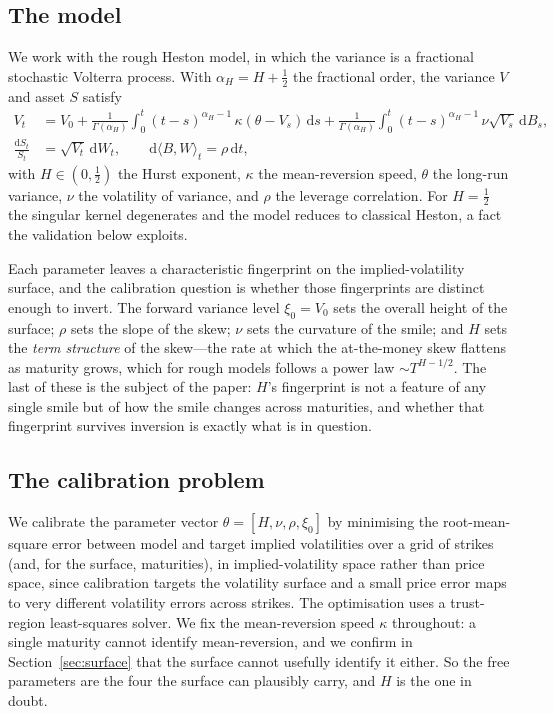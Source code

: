 \documentclass[11pt,a4paper]{article}
\numberwithin{equation}{section}
\begin{document}
\subsection{The model}

We work with the rough Heston model, in which the variance is a fractional stochastic
Volterra process. With $\alpha_{\!H}=H+\tfrac12$ the fractional order, the variance $V$ and
asset $S$ satisfy
\begin{align}
V_t &= V_0 + \frac{1}{\Gamma(\alpha_{\!H})}\int_0^t (t-s)^{\alpha_{\!H}-1}\,
       \kappa(\theta - V_s)\,\mathrm{d}s
     + \frac{1}{\Gamma(\alpha_{\!H})}\int_0^t (t-s)^{\alpha_{\!H}-1}\,
       \nu\sqrt{V_s}\,\mathrm{d}B_s, \\
\frac{\mathrm{d}S_t}{S_t} &= \sqrt{V_t}\,\mathrm{d}W_t,
\qquad \mathrm{d}\langle B,W\rangle_t = \rho\,\mathrm{d}t,
\end{align}
with $H\in(0,\tfrac12)$ the Hurst exponent, $\kappa$ the mean-reversion speed, $\theta$ the
long-run variance, $\nu$ the volatility of variance, and $\rho$ the leverage correlation.
For $H=\tfrac12$ the singular kernel degenerates and the model reduces to classical Heston, a
fact the validation below exploits.

Each parameter leaves a characteristic fingerprint on the implied-volatility surface, and the
calibration question is whether those fingerprints are distinct enough to invert. The forward
variance level $\xi_0=V_0$ sets the overall height of the surface; $\rho$ sets the slope of the
skew; $\nu$ sets the curvature of the smile; and $H$ sets the \emph{term structure} of the
skew---the rate at which the at-the-money skew flattens as maturity grows, which for rough
models follows a power law $\sim T^{H-1/2}$. The last of these is the subject of the paper:
$H$'s fingerprint is not a feature of any single smile but of how the smile changes across
maturities, and whether that fingerprint survives inversion is exactly what is in question.

\subsection{The calibration problem}

We calibrate the parameter vector $\theta=[H,\nu,\rho,\xi_0]$ by minimising the
root-mean-square error between model and target implied volatilities over a grid of strikes
(and, for the surface, maturities), in implied-volatility space rather than price space, since
calibration targets the volatility surface and a small price error maps to very different
volatility errors across strikes. The optimisation uses a trust-region least-squares solver.
We fix the mean-reversion speed $\kappa$ throughout: a single maturity cannot identify
mean-reversion, and we confirm in Section~\ref{sec:surface} that the surface cannot usefully
identify it either. So the free parameters are the four the surface can plausibly carry, and
$H$ is the one in doubt.
\end{document}
